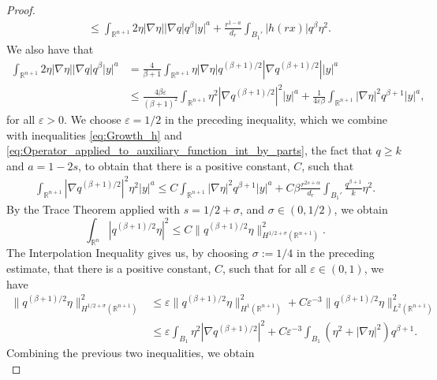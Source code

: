 \documentclass[11pt,reqno]{amsart}
\theoremstyle{definition}
\theoremstyle{remark}
\begin{document}
\begin{proof}
\begin{align}
&\leq \int_{{\mathbb{R}}^{n+1}} 2\eta|\nabla\eta||\nabla q| q^{\beta} |y|^a + \frac{r^{1-a}}{d_r} \int_{B_1'} |h(rx)| q^{\beta} \eta^2.
\end{align}
We also have that
\begin{align*}
\int_{{\mathbb{R}}^{n+1}} 2\eta|\nabla\eta||\nabla q| q^{\beta} |y|^a 
&=\frac{4}{\beta+1} \int_{{\mathbb{R}}^{n+1}}\eta|\nabla\eta| q^{(\beta+1)/2} \left|\nabla q^{(\beta+1)/2}\right||y|^a\\
&\leq \frac{4\beta{\varepsilon}}{(\beta+1)^2} \int_{{\mathbb{R}}^{n+1}}\eta^2 \left|\nabla q^{(\beta+1)/2}\right|^2|y|^a
+\frac{1}{4{\varepsilon}\beta} \int_{{\mathbb{R}}^{n+1}}|\nabla\eta|^2 q^{\beta+1} |y|^a,
\end{align*}
for all ${\varepsilon}>0$. We choose ${\varepsilon}=1/2$ in the preceding inequality, which we combine with inequalities \eqref{eq:Growth_h} and \eqref{eq:Operator_applied_to_auxiliary_function_int_by_parts}, the fact that $q \geq k$ and $a=1-2s$, to obtain that there is a positive constant, $C$, such that
\begin{align}
\label{eq:Estimate_grad_p_1}
\int_{{\mathbb{R}}^{n+1}} \left|\nabla q^{(\beta+1)/2}\right|^2 \eta^2 |y|^a \leq C\int_{{\mathbb{R}}^{n+1}} |\nabla\eta|^2 q^{\beta+1} |y|^a
+C\beta\frac{r^{2s+\alpha}}{d_r} \int_{B_1'} \frac{q^{\beta+1}}{k}\eta^2.
\end{align}
By the Trace Theorem \cite[Theorem 1.5.1.1]{Grisvard} applied with $s=1/2+\sigma$, and $\sigma \in (0,1/2)$, we obtain
\begin{equation*}
\int_{{\mathbb{R}}^n} \left|q^{(\beta+1)/2}\eta\right|^2 \leq C\|q^{(\beta+1)/2}\eta\|^2_{H^{1/2+\sigma}({\mathbb{R}}^{n+1})}.
\end{equation*}
The Interpolation Inequality \cite[Theorem 1.4.3.3]{Grisvard} gives us, by choosing $\sigma:=1/4$ in the preceding estimate, that there is a positive constant, $C$, such that for all ${\varepsilon}\in (0,1)$, we have 
\begin{align*}
\|q^{(\beta+1)/2}\eta\|^2_{H^{1/2+\sigma}({\mathbb{R}}^{n+1})} 
&\leq {\varepsilon}\|q^{(\beta+1)/2}\eta\|^2_{H^1({\mathbb{R}}^{n+1})} + C{\varepsilon}^{-3} \|q^{(\beta+1)/2}\eta\|^2_{L^2({\mathbb{R}}^{n+1})}\\
&\leq {\varepsilon}\int_{B_1} \eta^2 \left|\nabla q^{(\beta+1)/2}\right|^2 + C{\varepsilon}^{-3}\int_{B_1} \left(\eta^2+|\nabla\eta|^2\right)q^{\beta+1}.
\end{align*}
Combining the previous two inequalities, we obtain
\begin{equation}

\end{equation}
\end{proof}
\end{document}
